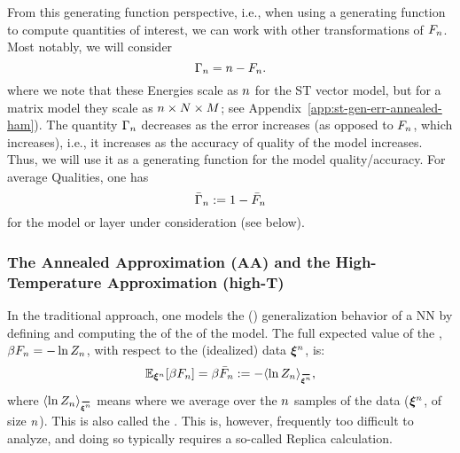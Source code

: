From this generating function perspective, i.e., when using a generating function to compute quantities of interest, we can work with other transformations of $F_{n}$.
Most notably, we will consider 
\begin{equation}
    \Gamma_{n} = n-F_{n} .
\end{equation}
where we note that these Energies scale as $n$ for the ST vector model, but for a  matrix model they scale as $n\times N\times M$; see Appendix~\ref{app:st-gen-err-annealed-ham}).
The quantity $\Gamma_{n}$ decreases as the error increases (as opposed to $F_{n}$, which increases), i.e., it increases as the accuracy of quality of the model increases.
Thus, we will use it as a generating function for the model quality/accuracy.  
For average Qualities, one has
\begin{equation} 
\label{eqn:GammaBar}
 \bar{\Gamma}_{n}:=1-\bar{F}_{n}
\end{equation} %
for the model or layer under consideration (see below).

\subsubsection{The Annealed Approximation (AA) and the High-Temperature Approximation (high-T)}
\label{sxn:mathP_annealed}

In the traditional \SMOG approach, one models the (\Typical) generalization behavior of a NN
by defining and computing the \ExpectedValue of the \FreeEnergy of the model.
The full expected value  of the \FreeEnergy, $\beta F_{n}=-\ln Z_{n}$, with respect to the (idealized) data $\boldsymbol{\xi}^{n}$, is:
\begin{align}
\label{eqn:mm_f_bar}
  \mathbb{E}_{\NDXIn}[\beta F_{\ND}]=\beta\bar{F}_{\ND}:=-\langle \ln Z_{\ND}\rangle_{\AVGNDXIn},
\end{align}
where $\langle \ln Z_{\ND}\rangle_{\AVGNDXIn}$ means where we average over  the $n$ samples of the data ($\boldsymbol{\xi}^{n}$, of size $n$).  This is also called the \Quenched \FreeEnergy.
This is, however,  frequently too difficult to analyze, and doing so typically
requires a so-called Replica calculation. 

